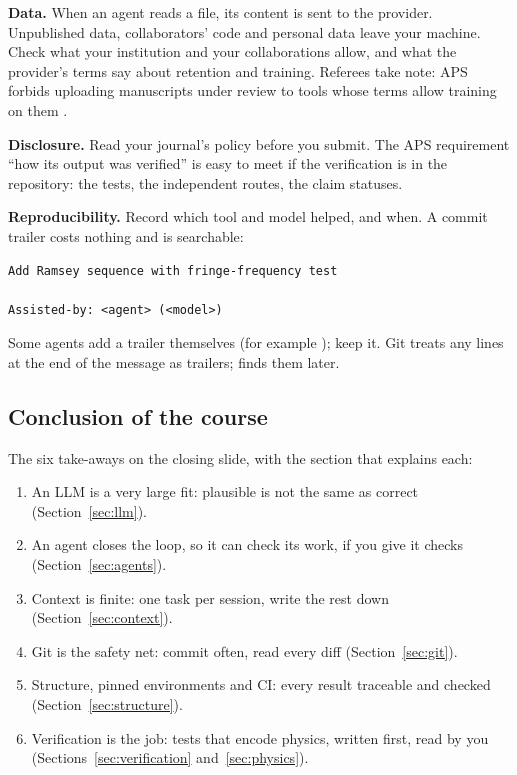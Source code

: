 \textbf{Data.} When an agent reads a file, its content is sent to the provider. Unpublished
data, collaborators' code and personal data leave your machine. Check what your
institution and your collaborations allow, and what the provider's terms say about
retention and training. Referees take note: APS forbids uploading manuscripts under review
to tools whose terms allow training on them .

\textbf{Disclosure.} Read your journal's policy before you submit. The APS
requirement ``how its output was verified'' is easy to meet if the verification is in
the repository: the tests, the independent routes, the claim statuses.

\textbf{Reproducibility.} Record which tool and model helped, and when. A commit trailer
costs nothing and is searchable:
\begin{lstlisting}
Add Ramsey sequence with fringe-frequency test

Assisted-by: <agent> (<model>)
\end{lstlisting}
Some agents add a trailer themselves (for example ); keep it. Git
treats any  lines at the end of the message as trailers;
 finds them later.

\subsection{Conclusion of the course}

The six take-aways on the closing slide, with the section that explains each:
\begin{enumerate}
  \item An LLM is a very large fit: plausible is not the same as correct
        (Section~\ref{sec:llm}).
  \item An agent closes the loop, so it can check its work, if you give it checks
        (Section~\ref{sec:agents}).
  \item Context is finite: one task per session, write the rest down
        (Section~\ref{sec:context}).
  \item Git is the safety net: commit often, read every diff (Section~\ref{sec:git}).
  \item Structure, pinned environments and CI: every result traceable and checked
        (Section~\ref{sec:structure}).
  \item Verification is the job: tests that encode physics, written first, read by you
        (Sections~\ref{sec:verification} and~\ref{sec:physics}).
\end{enumerate}

